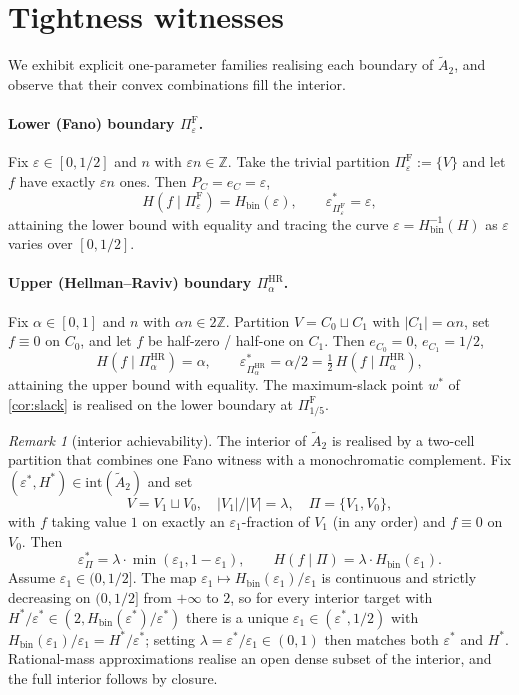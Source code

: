 \documentclass[10pt]{article}
\theoremstyle{definition}
\theoremstyle{remark}
\newtheorem{remark}[theorem]{Remark}
\newcommand{\Hbin}{H_{\mathrm{bin}}}
\newcommand{\Hinv}{H_{\mathrm{bin}}^{-1}}
\newcommand{\eps}{\varepsilon}
\newcommand{\epsP}{\eps^{\!*}_{\Pi}}
\newcommand{\Atilde}{\widetilde{A}_{2}}
\begin{document}
\section{Tightness witnesses}\label{sec:tightness}

We exhibit explicit one-parameter families realising each
boundary of $\Atilde$, and observe that their convex combinations
fill the interior.

\paragraph{Lower (Fano) boundary $\Pi^{\mathrm{F}}_{\eps}$.}
Fix $\eps \in [0, 1/2]$ and $n$ with $\eps n \in \mathbb{Z}$.
Take the trivial partition $\Pi^{\mathrm{F}}_{\eps} := \{V\}$
and let $f$ have exactly $\eps n$ ones. Then
$P_{C} = e_{C} = \eps$,
\[
  H(f \mid \Pi^{\mathrm{F}}_{\eps}) = \Hbin(\eps),
  \qquad
  \eps^{\!*}_{\Pi^{\mathrm{F}}_{\eps}} = \eps,
\]
attaining the lower bound with equality and tracing the curve
$\eps = \Hinv(H)$ as $\eps$ varies over $[0, 1/2]$.

\paragraph{Upper (Hellman--Raviv) boundary
$\Pi^{\mathrm{HR}}_{\alpha}$.} Fix $\alpha \in [0, 1]$ and $n$
with $\alpha n \in 2\mathbb{Z}$. Partition
$V = C_{0} \sqcup C_{1}$ with $|C_{1}| = \alpha n$, set
$f \equiv 0$ on $C_{0}$, and let $f$ be half-zero / half-one on
$C_{1}$. Then $e_{C_{0}} = 0$, $e_{C_{1}} = 1/2$,
\[
  H(f \mid \Pi^{\mathrm{HR}}_{\alpha}) = \alpha,
  \qquad
  \eps^{\!*}_{\Pi^{\mathrm{HR}}_{\alpha}}
  = \alpha/2 = \tfrac{1}{2}\,H(f \mid \Pi^{\mathrm{HR}}_{\alpha}),
\]
attaining the upper bound with equality. The maximum-slack point
$w^{*}$ of \cref{cor:slack} is realised on the lower boundary at
$\Pi^{\mathrm{F}}_{1/5}$.

\begin{remark}[interior achievability]\label{rem:interior}
The interior of $\Atilde$ is realised by a two-cell partition
that combines one Fano witness with a monochromatic complement.
Fix $(\eps^{*}, H^{*}) \in \mathrm{int}(\Atilde)$ and set
\[
  V = V_{1} \sqcup V_{0},
  \quad |V_{1}|/|V| = \lambda,
  \quad \Pi = \{V_{1}, V_{0}\},
\]
with $f$ taking value $1$ on exactly an $\eps_{1}$-fraction of
$V_{1}$ (in any order) and $f \equiv 0$ on $V_{0}$. Then
\[
  \epsP = \lambda \cdot \min(\eps_{1}, 1 - \eps_{1}),
  \qquad
  H(f \mid \Pi) = \lambda \cdot \Hbin(\eps_{1}).
\]
Assume $\eps_{1} \in (0, 1/2]$. The map
$\eps_{1} \mapsto \Hbin(\eps_{1}) / \eps_{1}$ is continuous and
strictly decreasing on $(0, 1/2]$ from $+\infty$ to $2$, so for
every interior target with $H^{*}/\eps^{*} \in (2, \Hbin(\eps^{*})/\eps^{*})$
there is a unique $\eps_{1} \in (\eps^{*}, 1/2)$ with
$\Hbin(\eps_{1})/\eps_{1} = H^{*}/\eps^{*}$; setting
$\lambda = \eps^{*}/\eps_{1} \in (0, 1)$ then matches both
$\eps^{*}$ and $H^{*}$. Rational-mass approximations realise an
open dense subset of the interior, and the full interior follows
by closure.
\end{remark}
\end{document}
